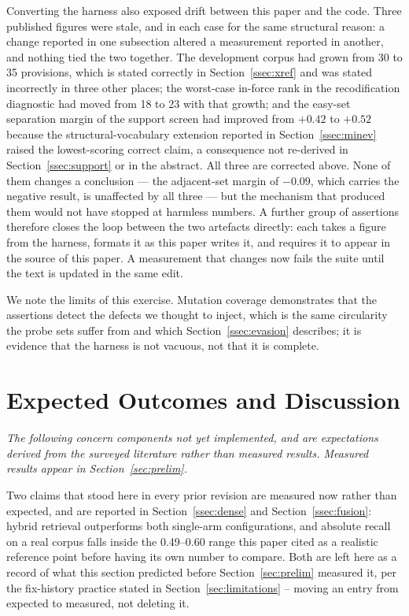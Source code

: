 \documentclass[conference]{IEEEtran}
\begin{document}
Converting the harness also exposed drift between this paper and the code. Three
published figures were stale, and in each case for the same structural reason:
a change reported in one subsection altered a measurement reported in another,
and nothing tied the two together. The development corpus had grown from 30 to
35 provisions, which is stated correctly in Section~\ref{ssec:xref} and was stated
incorrectly in three other places; the worst-case in-force rank in the
recodification diagnostic had moved from 18 to 23 with that growth; and the
easy-set separation margin of the support screen had improved from $+0.42$ to
$+0.52$ because the structural-vocabulary extension reported in Section~\ref{ssec:minev}
raised the lowest-scoring correct claim, a consequence not re-derived in
Section~\ref{ssec:support} or in the abstract. All three are corrected above. None of them
changes a conclusion --- the adjacent-set margin of $-0.09$, which carries the
negative result, is unaffected by all three --- but the mechanism that produced
them would not have stopped at harmless numbers. A further group of assertions
therefore closes the loop between the two artefacts directly: each takes a
figure from the harness, formats it as this paper writes it, and requires it to
appear in the source of this paper. A measurement that changes now fails the
suite until the text is updated in the same edit.

We note the limits of this exercise. Mutation coverage demonstrates that the
assertions detect the defects we thought to inject, which is the same
circularity the probe sets suffer from and which Section~\ref{ssec:evasion} describes; it is
evidence that the harness is not vacuous, not that it is complete.

\section{Expected Outcomes and Discussion}
\label{sec:outcomes}

\emph{The following concern components not yet implemented, and are expectations derived from the surveyed literature rather than measured results. Measured results appear in Section~\ref{sec:prelim}.}

Two claims that stood here in every prior revision are measured now rather than expected, and are reported in Section~\ref{ssec:dense} and Section~\ref{ssec:fusion}: hybrid retrieval outperforms both single-arm configurations, and absolute recall on a real corpus falls inside the 0.49--0.60 range \cite{rustamov2025} this paper cited as a realistic reference point before having its own number to compare. Both are left here as a record of what this section predicted before Section~\ref{sec:prelim} measured it, per the fix-history practice stated in Section~\ref{sec:limitations} -- moving an entry from expected to measured, not deleting it.
\end{document}
